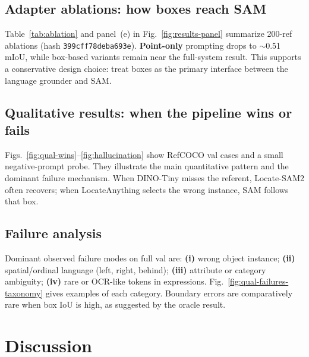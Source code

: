 \documentclass[11pt,a4paper]{article}
\begin{document}
\subsection{Adapter ablations: how boxes reach SAM}
\label{sec:ablation}

Table~\ref{tab:ablation} and panel~(e) in Fig.~\ref{fig:results-panel} summarize 200-ref ablations (hash \texttt{399cff78deba693e}).
\textbf{Point-only} prompting drops to $\sim$0.51 mIoU, while box-based variants remain near the full-system result.
This supports a conservative design choice: treat boxes as the primary interface between the language grounder and SAM.

\subsection{Qualitative results: when the pipeline wins or fails}
\label{sec:qual}

Figs.~\ref{fig:qual-wins}--\ref{fig:hallucination} show RefCOCO val cases and a small negative-prompt probe.
They illustrate the main quantitative pattern and the dominant failure mechanism.
When DINO-Tiny misses the referent, Locate-SAM2 often recovers; when LocateAnything selects the wrong instance, SAM follows that box.



\subsection{Failure analysis}
\label{sec:failures}

Dominant observed failure modes on full val are:
\textbf{(i)} wrong object instance;
\textbf{(ii)} spatial/ordinal language (left, right, behind);
\textbf{(iii)} attribute or category ambiguity;
\textbf{(iv)} rare or OCR-like tokens in expressions.
Fig.~\ref{fig:qual-failures-taxonomy} gives examples of each category.
Boundary errors are comparatively rare when box IoU is high, as suggested by the oracle result.

\FloatBarrier

\section{Discussion}
\label{sec:discussion}
\end{document}
